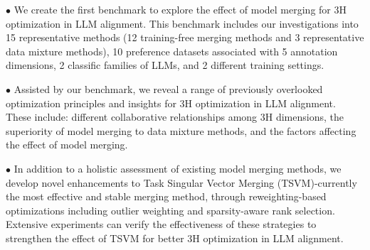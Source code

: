 $\bullet$ We create the first benchmark to explore the effect of model merging for 3H optimization in LLM alignment. This benchmark includes our investigations into 15 representative methods (12 training-free merging methods and 3 representative data mixture methods), 10 preference datasets associated with 5 annotation dimensions, 2 classific families of LLMs, and 2 different training settings.

$\bullet$ Assisted by our benchmark, we reveal a range of previously overlooked optimization principles and insights for 3H optimization in LLM alignment. These include: different collaborative relationships among 3H dimensions, the superiority of model merging to data mixture methods, and the factors affecting the effect of model merging.

$\bullet$ In addition to a holistic assessment of existing model merging methods, we develop novel enhancements to Task Singular Vector Merging (TSVM)-currently the most effective and stable merging method, through reweighting-based optimizations including outlier weighting and sparsity-aware rank selection. Extensive experiments can verify the effectiveness of these strategies to strengthen the effect of TSVM for better 3H optimization in LLM alignment. 










